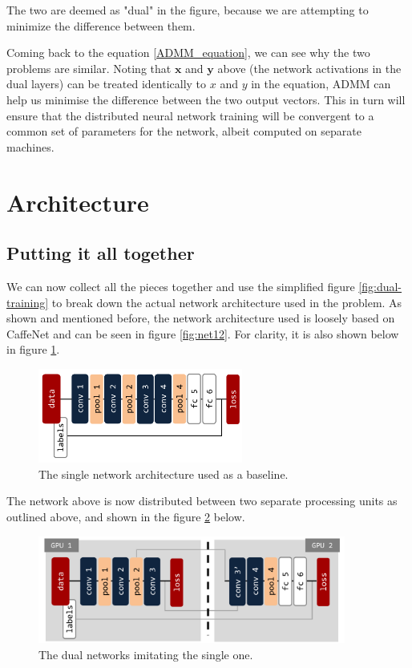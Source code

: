 \documentclass[a4paper, 12pt]{article}
\numberwithin{equation}{section}
\begin{document}
	The two are deemed as "dual" in the figure, because we are attempting to minimize the difference between them.
	
	Coming back to the equation \ref{ADMM_equation}, we can see why the two problems are similar. Noting that $\boldsymbol x$ and $\boldsymbol y$ above (the network activations in the dual layers) can be treated identically to $x$ and $y$ in the equation, ADMM can help us minimise the difference between the two output vectors. This in turn will ensure that the distributed neural network training will be convergent to a common set of parameters for the network, albeit computed on separate machines.
	
	\section{Architecture}
	
	\subsection{Putting it all together}
	
	We can now collect all the pieces together and use the simplified figure \ref{fig:dual-training} to break down the actual network architecture used in the problem. As shown and mentioned before, the network architecture used is loosely based on CaffeNet and can be seen in figure \ref{fig:net12}. For clarity, it is also shown below in figure \ref{fig:net12pretty}.
	
	\begin{figure}[!h]
		\centering
		\includegraphics[page=1,width=0.6\textwidth]{net12.pdf}
		\caption{\label{fig:net12pretty}{The single network architecture used as a baseline.}}
	\end{figure}
	
	The network above is now distributed between two separate processing units as outlined above, and shown in the figure \ref{fig:net12separate} below.
	
	\begin{figure}[!h]
		\centering
		\includegraphics[page=1,width=0.9\textwidth]{net12separate.pdf}
		\caption{\label{fig:net12separate}{The dual networks imitating the single one.}}
	\end{figure}
	
\end{document}
